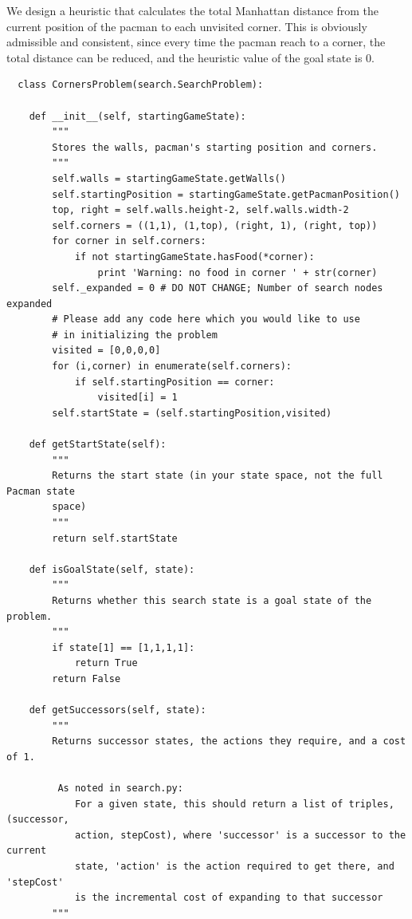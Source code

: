 \documentclass[a4paper, 11pt]{article}
\begin{document}
We design a heuristic that calculates the total Manhattan distance from the current position of the pacman to each unvisited corner.
This is obviously admissible and consistent, since every time the pacman reach to a corner, the total distance can be reduced, and the heuristic value of the goal state is 0.

\begin{lstlisting}
  class CornersProblem(search.SearchProblem):

    def __init__(self, startingGameState):
        """
        Stores the walls, pacman's starting position and corners.
        """
        self.walls = startingGameState.getWalls()
        self.startingPosition = startingGameState.getPacmanPosition()
        top, right = self.walls.height-2, self.walls.width-2
        self.corners = ((1,1), (1,top), (right, 1), (right, top))
        for corner in self.corners:
            if not startingGameState.hasFood(*corner):
                print 'Warning: no food in corner ' + str(corner)
        self._expanded = 0 # DO NOT CHANGE; Number of search nodes expanded
        # Please add any code here which you would like to use
        # in initializing the problem
        visited = [0,0,0,0]
        for (i,corner) in enumerate(self.corners):
            if self.startingPosition == corner:
                visited[i] = 1
        self.startState = (self.startingPosition,visited)

    def getStartState(self):
        """
        Returns the start state (in your state space, not the full Pacman state
        space)
        """
        return self.startState

    def isGoalState(self, state):
        """
        Returns whether this search state is a goal state of the problem.
        """
        if state[1] == [1,1,1,1]:
            return True
        return False

    def getSuccessors(self, state):
        """
        Returns successor states, the actions they require, and a cost of 1.

         As noted in search.py:
            For a given state, this should return a list of triples, (successor,
            action, stepCost), where 'successor' is a successor to the current
            state, 'action' is the action required to get there, and 'stepCost'
            is the incremental cost of expanding to that successor
        """


\end{lstlisting}
\end{document}
